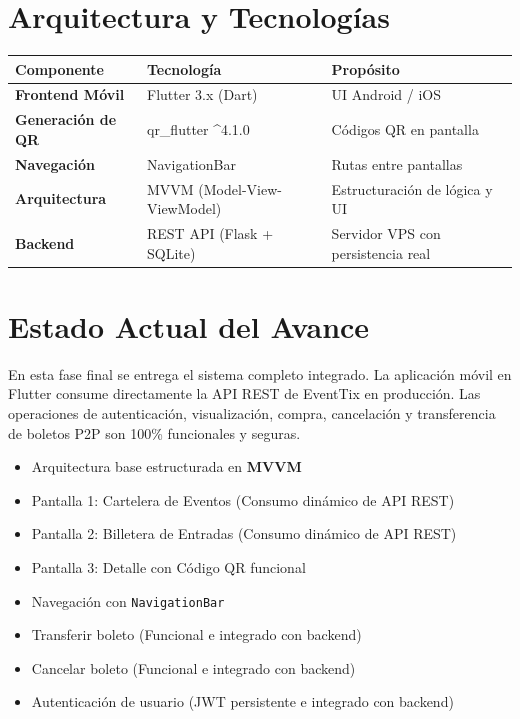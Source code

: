 \documentclass[12pt, letterpaper]{article}
\begin{document}
\section{Arquitectura y Tecnologías}

\begin{center}
\begin{tabular}{|>{\bfseries}l | l | l|}
    \hline
    Componente        & Tecnología              & Propósito \\
    \hline
    Frontend Móvil    & Flutter 3.x (Dart)      & UI Android / iOS \\
    Generación de QR  & qr\_flutter \^{}4.1.0   & Códigos QR en pantalla \\
    Navegación        & NavigationBar           & Rutas entre pantallas \\
    Arquitectura      & MVVM (Model-View-ViewModel) & Estructuración de lógica y UI \\
    Backend           & REST API (Flask + SQLite)  & Servidor VPS con persistencia real \\
    \hline
\end{tabular}
\end{center}

\section{Estado Actual del Avance}

En esta fase final se entrega el sistema completo integrado. La aplicación móvil en
Flutter consume directamente la API REST de EventTix en producción. Las operaciones de
autenticación, visualización, compra, cancelación y transferencia de boletos P2P son
100\% funcionales y seguras.

\begin{itemize}[noitemsep]
    \item[$\checkmark$] Arquitectura base estructurada en \textbf{MVVM}
    \item[$\checkmark$] Pantalla 1: Cartelera de Eventos (Consumo dinámico de API REST)
    \item[$\checkmark$] Pantalla 2: Billetera de Entradas (Consumo dinámico de API REST)
    \item[$\checkmark$] Pantalla 3: Detalle con Código QR funcional
    \item[$\checkmark$] Navegación con \texttt{NavigationBar}
    \item[$\checkmark$] Transferir boleto (Funcional e integrado con backend)
    \item[$\checkmark$] Cancelar boleto (Funcional e integrado con backend)
    \item[$\checkmark$] Autenticación de usuario (JWT persistente e integrado con backend)
\end{itemize}
\end{document}
